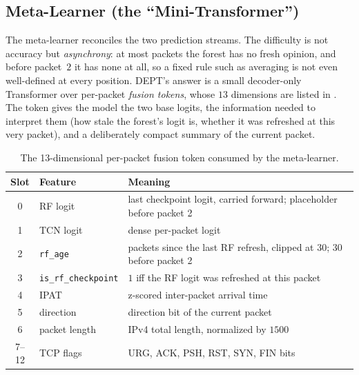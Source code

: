 \subsection{Meta-Learner (the ``Mini-Transformer'')}\label{subsec:sol-meta}
The meta-learner reconciles the two prediction streams. The difficulty is not accuracy
but \emph{asynchrony}: at most packets the forest has no fresh opinion, and before
packet~$2$ it has none at all, so a fixed rule such as averaging is not even
well-defined at every position. DEPT's answer is a small decoder-only Transformer
over per-packet \emph{fusion tokens}, whose $13$ dimensions are listed in
. The token gives the model the two base logits, the information
needed to interpret them (how stale the forest's logit is, whether it was refreshed at
this very packet), and a deliberately compact summary of the current packet.

\begin{table}[htbp]
    \centering
    \caption[The 13-dimensional fusion token.]{The 13-dimensional per-packet fusion
    token consumed by the meta-learner.}
    \label{tab:sol-token}
    \begin{tabular}{@{}cll@{}}
        \toprule
        \textbf{Slot} & \textbf{Feature} & \textbf{Meaning} \\
        \midrule
        0 & RF logit & last checkpoint logit, carried forward; placeholder before packet 2 \\
        1 & TCN logit & dense per-packet logit \\
        2 & \texttt{rf\_age} & packets since the last RF refresh, clipped at $30$; $30$ before packet 2 \\
        3 & \texttt{is\_rf\_checkpoint} & $1$ iff the RF logit was refreshed at this packet \\
        4 & IPAT & z-scored inter-packet arrival time \\
        5 & direction & direction bit of the current packet \\
        6 & packet length & IPv4 total length, normalized by $1500$ \\
        7--12 & TCP flags & URG, ACK, PSH, RST, SYN, FIN bits \\
        \bottomrule
    \end{tabular}
\end{table}

